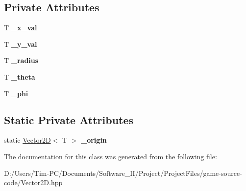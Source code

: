 \subsection*{Private Attributes}
\begin{DoxyCompactItemize}
\item 
\mbox{\label{class_vector2_d_a8f8fc33b4c41c5b0f29351d160e55e43}} 
T {\bfseries \+\_\+x\+\_\+val}
\item 
\mbox{\label{class_vector2_d_aa0dd951527b98a9ecebb0ab2f260dbeb}} 
T {\bfseries \+\_\+y\+\_\+val}
\item 
\mbox{\label{class_vector2_d_a524454b2dd476421734786f847c3f2b3}} 
T {\bfseries \+\_\+radius}
\item 
\mbox{\label{class_vector2_d_aab1750b8605c28bbfe47ed41cf526f3f}} 
T {\bfseries \+\_\+theta}
\item 
\mbox{\label{class_vector2_d_aefc834f88cb43eceb3c44f09bcd266b6}} 
T {\bfseries \+\_\+phi}
\end{DoxyCompactItemize}
\subsection*{Static Private Attributes}
\begin{DoxyCompactItemize}
\item 
\mbox{\label{class_vector2_d_a8205b796e7a3e791bf9ede4d1ccdc6ff}} 
static \hyperlink{class_vector2_d}{Vector2D}$<$ T $>$ {\bfseries \+\_\+origin}
\end{DoxyCompactItemize}


The documentation for this class was generated from the following file\+:\begin{DoxyCompactItemize}
\item 
D\+:/\+Users/\+Tim-\/\+P\+C/\+Documents/\+Software\+\_\+\+I\+I/\+Project/\+Project\+Files/game-\/source-\/code/Vector2\+D.\+hpp\end{DoxyCompactItemize}
